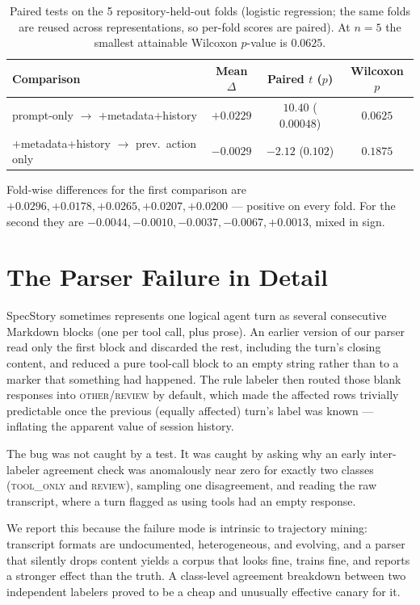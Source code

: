 \documentclass{article}
\begin{document}
\begin{table}[h]
\caption{Paired tests on the 5 repository-held-out folds (logistic regression;
the same folds are reused across representations, so per-fold scores are
paired). At $n{=}5$ the smallest attainable Wilcoxon $p$-value is $0.0625$.}
\label{tab:paired}
\centering
\small
\begin{tabular}{lccc}
\toprule
Comparison & Mean $\Delta$ & Paired $t$ ($p$) & Wilcoxon $p$ \\
\midrule
prompt-only $\to$ $+$metadata$+$history & $+0.0229$ & $10.40$ ($0.00048$) & $0.0625$ \\
$+$metadata$+$history $\to$ prev.\ action only & $-0.0029$ & $-2.12$ ($0.102$) & $0.1875$ \\
\bottomrule
\end{tabular}
\end{table}

Fold-wise differences for the first comparison are
$+0.0296, +0.0178, +0.0265, +0.0207, +0.0200$ --- positive on every fold. For
the second they are $-0.0044, -0.0010, -0.0037, -0.0067, +0.0013$, mixed in
sign.

\section{The Parser Failure in Detail}
\label{app:parser}

SpecStory sometimes represents one logical agent turn as several consecutive
Markdown blocks (one per tool call, plus prose). An earlier version of our
parser read only the first block and discarded the rest, including the turn's
closing content, and reduced a pure tool-call block to an empty string rather
than to a marker that something had happened. The rule labeler then routed those
blank responses into \textsc{other}/\textsc{review} by default, which made the
affected rows trivially predictable once the previous (equally affected) turn's
label was known --- inflating the apparent value of session history.

The bug was not caught by a test. It was caught by asking why an early
inter-labeler agreement check was anomalously near zero for exactly two classes
(\textsc{tool\_only} and \textsc{review}), sampling one disagreement, and reading
the raw transcript, where a turn flagged as using tools had an empty response.

We report this because the failure mode is intrinsic to trajectory mining:
transcript formats are undocumented, heterogeneous, and evolving, and a parser
that silently drops content yields a corpus that looks fine, trains fine, and
reports a stronger effect than the truth. A class-level agreement breakdown
between two independent labelers proved to be a cheap and unusually effective
canary for it.
\end{document}

